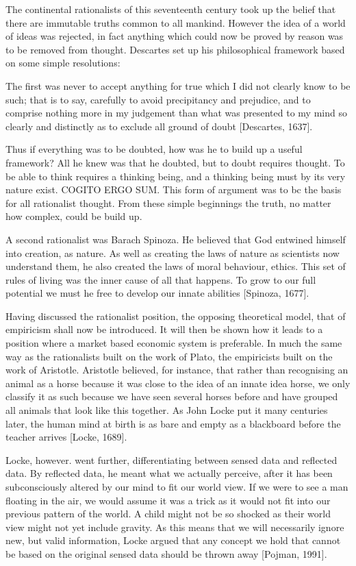 The continental rationalists of this seventeenth century took up the belief that there are immutable truths common to all mankind. However the idea of a world of ideas was rejected, in fact anything which could now be proved by reason was to be removed from thought. Descartes set up his philosophical framework based on some simple resolutions:

\begin{displayquote}
The first was never to accept anything for true which I did not clearly know to be such; that is to say, carefully to avoid precipitancy and prejudice, and to comprise nothing more in my judgement than what was presented to my mind so clearly and distinctly as to exclude all ground of doubt [Descartes, 1637].
\end{displayquote}

Thus if everything was to be doubted, how was he to build up a useful framework? All he knew was that he doubted, but to doubt requires thought. To be able to think requires a thinking being, and a thinking being must by its very nature exist. COGITO ERGO SUM. This form of argument was to bc the basis for all rationalist thought. From these simple beginnings the truth, no matter how complex, could be build up.

A second rationalist was Barach Spinoza. He believed that God entwined himself into creation, as nature. As well as creating the laws of nature as scientists now understand them, he also created the laws of moral behaviour, ethics. This set of rules of living was the inner cause of all that happens. To grow to our full potential we must he free to develop our innate abilities [Spinoza, 1677].

Having discussed the rationalist position, the opposing theoretical model, that of empiricism shall now be introduced. It will then be shown how it leads to a position where a market based economic system is preferable. In much the same way as the rationalists built on the work of Plato, the empiricists built on the work of Aristotle. Aristotle believed, for instance, that rather than recognising an animal as a horse because it was close to the idea of an innate idea horse, we only classify it as such because we have seen several horses before and have grouped all animals that look like this together. As John Locke put it many centuries later, the human mind at birth is as bare and empty as a blackboard before the teacher arrives [Locke, 1689].

Locke, however. went further, differentiating between sensed data and reflected data. By reflected data, he meant what we actually perceive, after it has been subconsciously altered by our mind to fit our world view. If we were to see a man floating in the air, we would assume it was a trick as it would not fit into our previous pattern of the world. A child might not be so shocked as their world view might not yet include gravity. As this means that we will necessarily ignore new, but valid information, Locke argued that any concept we hold that cannot be based on the original sensed data should be thrown away [Pojman, 1991].

